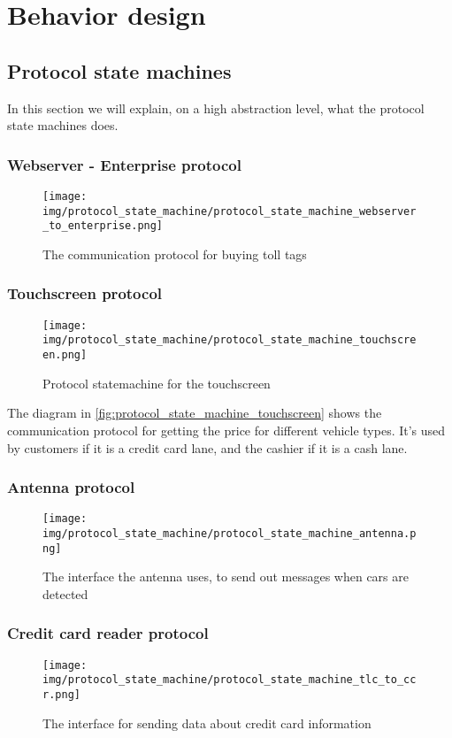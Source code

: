 \section*{Behavior design}
\subsection*{Protocol state machines}
In this section we will explain, on a high abstraction level, what the protocol state machines does.
\subsubsection*{Webserver - Enterprise protocol}
\begin{figure}[H]
\centering
\texttt{[image: img/protocol\_state\_machine/protocol\_state\_machine\_webserver\_to\_enterprise.png]}
\caption{The communication protocol for buying toll tags}
\label{fig:protocol_state_machine_webserver_to_enterprise}
\end{figure}

\subsubsection*{Touchscreen protocol}
\begin{figure}[H]
\centering
\texttt{[image: img/protocol\_state\_machine/protocol\_state\_machine\_touchscreen.png]}
\caption{Protocol statemachine for the touchscreen}
\label{fig:protocol_state_machine_touchscreen}
\end{figure}
The diagram in \autoref{fig:protocol_state_machine_touchscreen} shows the communication protocol for getting the price for different vehicle types. It's used by customers if it is a credit card lane, and the cashier if it is a cash lane.

\subsubsection*{Antenna protocol}
\begin{figure}[H]
\centering
\texttt{[image: img/protocol\_state\_machine/protocol\_state\_machine\_antenna.png]}
\caption{The interface the antenna uses, to send out messages when cars are detected}
\label{fig:protocol_state_machine_antenna}
\end{figure}

\subsubsection*{Credit card reader protocol}
\begin{figure}[H]
\centering
\texttt{[image: img/protocol\_state\_machine/protocol\_state\_machine\_tlc\_to\_ccr.png]}
\caption{The interface for sending data about credit card information}
\label{fig:protocol_state_machine_tlc_to_ccr}
\end{figure}

